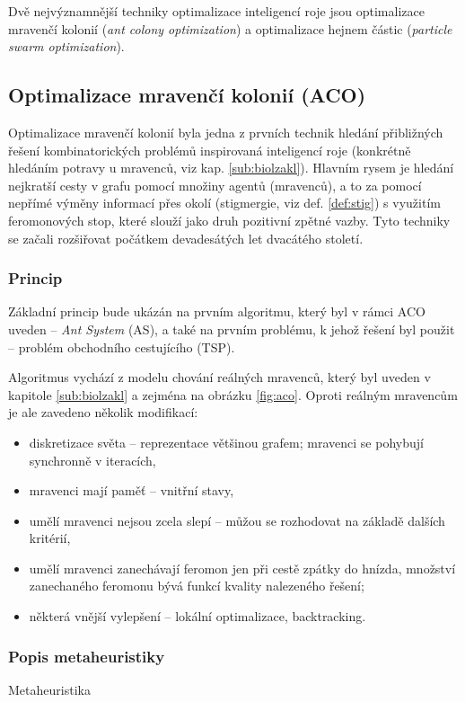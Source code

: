 \documentclass[a4paper,12pt]{article}
\begin{document}
Dvě nejvýznamnější techniky optimalizace inteligencí roje jsou optimalizace mravenčí
kolonií ({\it ant colony optimization}) a optimalizace hejnem částic ({\it particle swarm optimization}).

\subsection{Optimalizace mravenčí kolonií (ACO)}
Optimalizace mravenčí kolonií byla jedna z prvních technik hledání přibližných řešení kombinatorických
problémů inspirovaná inteligencí roje (konkrétně hledáním potravy u mravenců, viz kap. \ref{sub:biolzakl}).
Hlavním rysem je hledání nejkratší cesty v grafu pomocí množiny agentů (mravenců), a to za pomocí nepřímé výměny
informací přes okolí (stigmergie, viz def. \ref{def:stig}) s využitím feromonových stop, které slouží jako druh
pozitivní zpětné vazby. Tyto techniky se začali rozšiřovat počátkem devadesátých let dvacátého století.

\subsubsection{Princip}
Základní princip bude ukázán na prvním algoritmu, který byl v rámci ACO uveden -- {\it Ant System} (AS), a také
na prvním problému, k jehož řešení byl použit -- problém obchodního cestujícího (TSP).

Algoritmus vychází z modelu chování reálných mravenců, který byl uveden v kapitole \ref{sub:biolzakl} a zejména
na obrázku \ref{fig:aco}. Oproti reálným mravencům je ale zavedeno několik modifikací:
\begin{itemize}
  \item diskretizace světa -- reprezentace většinou grafem; mravenci se pohybují synchronně v iteracích,
  \item mravenci mají paměť -- vnitřní stavy,
  \item umělí mravenci nejsou zcela slepí -- můžou se rozhodovat na základě dalších kritérií,
  \item umělí mravenci zanechávají feromon jen při cestě zpátky do hnízda, množství zanechaného feromonu bývá
        funkcí kvality nalezeného řešení; 
  \item některá vnější vylepšení -- lokální optimalizace, backtracking.
\end{itemize}




\subsubsection{Popis metaheuristiky}
Metaheuristika 
\end{document}
